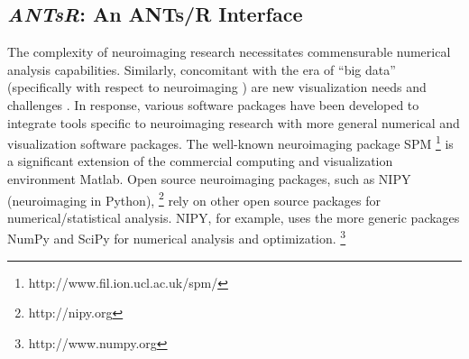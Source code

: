 \documentclass[preprint,authoryear,review,12pt]{elsarticle}
\begin{document}









\subsection{\textit{ANTsR}:  An ANTs/R Interface}

The complexity of neuroimaging research necessitates 
commensurable numerical analysis capabilities.  Similarly, concomitant
with the era of ``big data'' (specifically with respect to neuroimaging
\citep{vanhorn2013}) are new visualization needs and challenges
\citep{childs2013,kehrer2013}.
In response, various software packages have been developed to
integrate tools specific to neuroimaging research with more general
numerical and visualization software packages.
The well-known neuroimaging package SPM%
\footnote{
http://www.fil.ion.ucl.ac.uk/spm/
}
is a significant extension of the commercial computing and visualization environment
Matlab.  Open source neuroimaging packages, such as NIPY (neuroimaging in Python),%
\footnote{
http://nipy.org
} 
rely on other open source packages for numerical/statistical analysis.  NIPY,
for example, uses the more generic packages NumPy and SciPy for numerical analysis and 
optimization.%
\footnote{
http://www.numpy.org
}  
\end{document}
